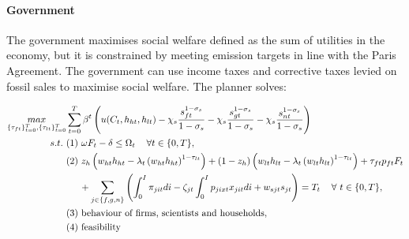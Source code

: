 \paragraph{Government}

The government maximises social welfare defined as the sum of utilities in the economy, but it is constrained by meeting emission targets in line with the Paris Agreement. The government can use income taxes and corrective taxes levied on fossil sales to maximise social welfare. The planner solves:

\begin{align*}
\underset{\{\tau_{ft}\}_{t=0}^{T},\{\tau_{lt}\}_{t=0}^{T}}{max}&\sum_{t=0}^{T}\beta^t\left( u(C_{t}, h_{ht}, h_{lt})-\chi_s\frac{s_{ft}^{1-\sigma_s}}{{1-\sigma_s}}-\chi_s\frac{s_{gt}^{1-\sigma_s}}{{1-\sigma_s}}-\chi_s\frac{s_{nt}^{1-\sigma_s}}{{1-\sigma_s}}\right) \\
s.t.\ %
& (1)\ \omega F_{t} -\delta \leq \Omega_t \ \hspace{3mm} \forall t \in\{0,T\}, \\ %
& (2)\ z_h\left(w_{ht}h_{ht}-\lambda_t \left(w_{ht}h_{ht}\right)^{1-\tau_{lt}}\right)+(1-z_h)\left(w_{lt}h_{lt}-\lambda_t\left(w_{lt}h_{lt}\right)^{1-\tau_{lt}}\right) +\tau_{ft}p_{ft}F_{t}  \\
& \hspace{5mm} +\sum_{j\in\{f,g,n\}}\left(\int_{0}^{I}\pi_{jit}di-\zeta_{jt}\int_{0}^{I}p_{jixt}x_{jit}di+w_{sjt}s_{jt}\right)= T_t \ \hspace{3mm} \forall \ t\in\{0,T\}, \\
& (3)\ \text{behaviour of firms, scientists and households},\\
& (4)\ \text{feasibility}
\end{align*}

